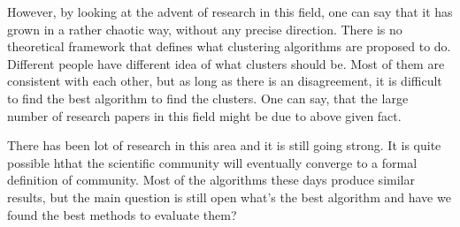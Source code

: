 \documentclass[letterpaper]{article}
\begin{document}
However, by looking at the advent of research in this field, one can say that
it has grown in a rather chaotic way, without any precise direction. There is
no theoretical framework that defines what clustering algorithms are proposed
to do. Different people have different idea of what clusters should be. Most of
them are consistent with each other, but as long as there is an disagreement,
it is difficult to find the best algorithm to find the clusters. One can say,
that the large number of research papers in this field might be due to above
given fact.

There has been lot of research in this area and it is still going strong. It is quite
possible hthat the scientific community will eventually converge to a formal definition
of community. Most of the algorithms these days produce similar results, but the main
question is still open what's the best algorithm and have we found the best methods to
evaluate them?
 
\end{document}
